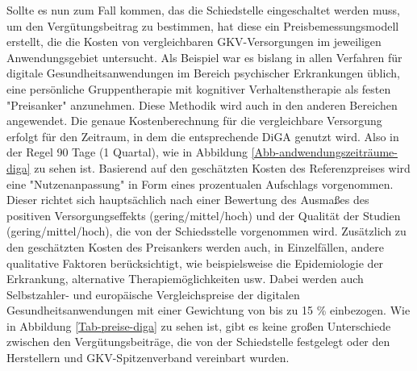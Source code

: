 \documentclass{article}
\begin{document}
			Sollte es nun zum Fall kommen, das die Schiedstelle eingeschaltet werden muss, um den Vergütungsbeitrag zu bestimmen, hat diese ein Preisbemessungsmodell erstellt, die die Kosten von vergleichbaren GKV-Versorgungen im jeweiligen Anwendungsgebiet untersucht. Als Beispiel war es bislang in allen Verfahren für digitale Gesundheitsanwendungen im Bereich psychischer Erkrankungen üblich, eine persönliche Gruppentherapie mit kognitiver Verhaltenstherapie als festen "Preisanker" anzunehmen. Diese Methodik wird auch in den anderen Bereichen angewendet. Die genaue Kostenberechnung für die vergleichbare Versorgung erfolgt für den Zeitraum, in dem die entsprechende DiGA genutzt wird.\cite[vgl. S. 13]{TK-Report-2} Also in der Regel 90 Tage (1 Quartal), wie in Abbildung \ref{Abb-andwendungszeiträume-diga} zu sehen ist. Basierend auf den geschätzten Kosten des Referenzpreises wird eine "Nutzenanpassung" in Form eines prozentualen Aufschlags vorgenommen. Dieser richtet sich hauptsächlich nach einer Bewertung des Ausmaßes des positiven Versorgungseffekts (gering/mittel/hoch) und der Qualität der Studien (gering/mittel/hoch), die von der Schiedsstelle vorgenommen wird. Zusätzlich zu den geschätzten Kosten des Preisankers werden auch, in Einzelfällen, andere qualitative Faktoren berücksichtigt, wie beispielsweise die Epidemiologie der Erkrankung, alternative Therapiemöglichkeiten usw. Dabei werden auch Selbstzahler- und europäische Vergleichspreise der digitalen Gesundheitsanwendungen mit einer Gewichtung von bis zu 15 \% einbezogen.\cite[vgl. S. 13]{TK-Report-2} Wie in Abbildung \ref{Tab-preise-diga} zu sehen ist, gibt es keine großen Unterschiede zwischen den Vergütungsbeiträge, die von der Schiedstelle festgelegt oder den Herstellern und GKV-Spitzenverband vereinbart wurden. 
\end{document}
